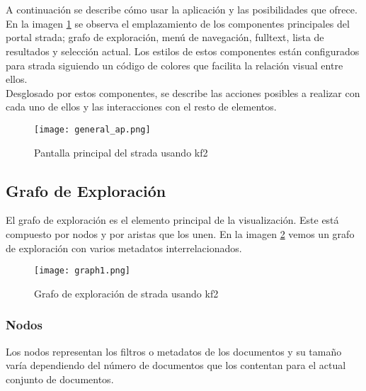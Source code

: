 \section{}
A continuación se describe cómo usar la aplicación y las posibilidades que ofrece. En la imagen \ref{image:manualgeneral} se observa  el emplazamiento de los componentes principales del portal \gls{strada}; grafo de exploración, menú de navegación, \gls{fulltext}, lista de resultados y selección actual. Los estilos de estos componentes están configurados para \gls{strada} siguiendo un código de colores que facilita la relación visual entre ellos.\\

Desglosado por estos componentes, se describe las acciones posibles a realizar con cada uno de ellos y las interacciones con el resto de elementos.

\begin{figure}[h!]
  \centering
  	\texttt{[image: general\_ap.png]}
  \caption{Pantalla principal del \gls{strada} usando \gls{kf2}}
  \label{image:manualgeneral}
\end{figure}

\subsection{Grafo de Exploración}
El grafo de exploración es el elemento principal de la visualización. Este está compuesto por nodos y por aristas que los unen. En la imagen \ref{image:manualgrafo} vemos un grafo de exploración con varios \glspl{metadato} interrelacionados.

\begin{figure}[h!]
  \centering
  	\texttt{[image: graph1.png]}
  \caption{Grafo de exploración de \gls{strada} usando \gls{kf2}}
  \label{image:manualgrafo}
\end{figure}

\subsubsection{Nodos}
Los nodos representan los filtros o \glspl{metadato} de los documentos y su tamaño varía dependiendo del número de documentos que los contentan para el actual conjunto de documentos.\\

